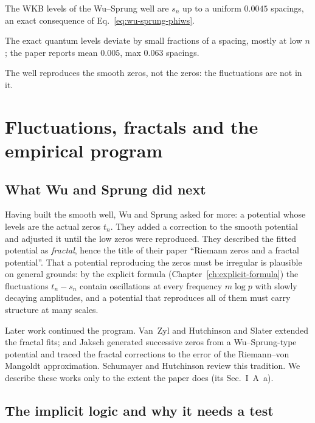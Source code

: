 \begin{keyideas}
\item The WKB levels of the Wu--Sprung well are $s_n$ up to a uniform $0.0045$ spacings, an exact consequence of Eq.~\eqref{eq:wu-sprung-phiws}.
\item The exact quantum levels deviate by small fractions of a spacing, mostly at low $n$; the paper reports mean $0.005$, max $0.063$ spacings.
\item The well reproduces the smooth zeros, not the zeros: the fluctuations are not in it.
\end{keyideas}

\section{Fluctuations, fractals and the empirical program}\label{sec:wu-sprung-empirical}

\subsection{What Wu and Sprung did next}

Having built the smooth well, Wu and Sprung \cite{wusprung} asked for more: a potential whose levels are the actual zeros $t_n$. They added a correction to the smooth potential and adjusted it until the low zeros were reproduced. They described the fitted potential as \emph{fractal}, hence the title of their paper ``Riemann zeros and a fractal potential''. That a potential reproducing the zeros must be irregular is plausible on general grounds: by the explicit formula (Chapter~\ref{ch:explicit-formula}) the fluctuations $t_n-s_n$ contain oscillations at every frequency $m\log p$ with slowly decaying amplitudes, and a potential that reproduces all of them must carry structure at many scales.

Later work continued the program. Van~Zyl and Hutchinson \cite{vanzyl} and Slater \cite{slater} extended the fractal fits; and Jaksch \cite{jaksch} generated successive zeros from a Wu--Sprung-type potential and traced the fractal corrections to the error of the Riemann--von Mangoldt approximation. Schumayer and Hutchinson \cite{schumayer} review this tradition. We describe these works only to the extent the paper does (its Sec.~I~A~a).

\subsection{The implicit logic and why it needs a test}

